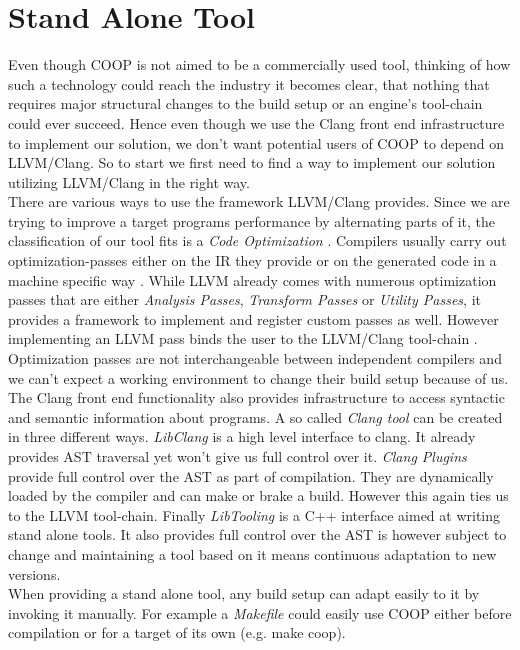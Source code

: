 \section{Stand Alone Tool}\label{stand_alone_tool}
Even though COOP is not aimed to be a commercially used tool, thinking of how such a technology could reach the industry it becomes clear, that nothing that requires major structural changes to the build setup or an engine's tool-chain could ever succeed. Hence even though we use the Clang front end infrastructure to implement our solution, we don't want potential users of COOP to depend on LLVM/Clang. So to start we first need to find a way to implement our solution utilizing LLVM/Clang in the right way.\\ 
There are various ways to use the framework LLVM/Clang provides. Since we are trying to improve a target programs performance by alternating parts of it, the classification of our tool fits is a \textit{Code Optimization} . Compilers usually carry out optimization-passes either on the IR they provide or on the generated code in a machine specific way . While LLVM already comes with numerous optimization passes that are either \textit{Analysis Passes}, \textit{Transform Passes} or \textit{Utility Passes}, it provides a framework to implement and register custom passes as well. However implementing an LLVM pass binds the user to the LLVM/Clang tool-chain . Optimization passes are not interchangeable between independent compilers and we can't expect a working environment to change their build setup because of us.\\
The Clang front end functionality also provides infrastructure to access syntactic and semantic information about programs. A so called \textit{Clang tool} can be created in three different ways.
\textit{LibClang} is a high level interface to clang. It already provides AST traversal yet won't give us full control over it. \textit{Clang Plugins} provide full control over the AST as part of compilation. They are dynamically loaded by the compiler and can make or brake a build. However this again ties us to the LLVM tool-chain. Finally \textit{LibTooling} is a C++ interface aimed at writing stand alone tools. It also provides full control over the AST is however subject to change and maintaining a tool based on it means continuous adaptation to new versions. \\
When providing a stand alone tool, any build setup can adapt easily to it by invoking it manually. For example a \textit{Makefile} could easily use COOP either before compilation or for a target of its own (e.g. make coop).\\

